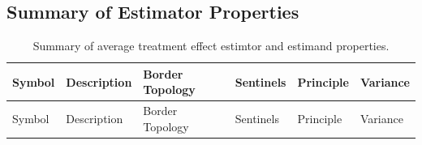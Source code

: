 \documentclass[letter]{article}
\begin{document}
    	\subsection{Summary of Estimator Properties}\label{summary-of-estimator-properties}

\begin{longtable}[]{@{}llllll@{}}
\caption{Summary of average treatment effect estimtor and estimand properties. \label{table:estimator_properties}}\tabularnewline
\toprule
\begin{minipage}[b]{0.09\columnwidth}\raggedright\strut
Symbol\strut
\end{minipage} & \begin{minipage}[b]{0.25\columnwidth}\raggedright\strut
Description\strut
\end{minipage} & \begin{minipage}[b]{0.13\columnwidth}\raggedright\strut
Border Topology\strut
\end{minipage} & \begin{minipage}[b]{0.13\columnwidth}\raggedright\strut
Sentinels\strut
\end{minipage} & \begin{minipage}[b]{0.15\columnwidth}\raggedright\strut
Principle\strut
\end{minipage} & \begin{minipage}[b]{0.08\columnwidth}\raggedright\strut
Variance\strut
\end{minipage}\tabularnewline
\midrule
\endfirsthead
\toprule
\begin{minipage}[b]{0.09\columnwidth}\raggedright\strut
Symbol\strut
\end{minipage} & \begin{minipage}[b]{0.25\columnwidth}\raggedright\strut
Description\strut
\end{minipage} & \begin{minipage}[b]{0.13\columnwidth}\raggedright\strut
Border Topology\strut
\end{minipage} & \begin{minipage}[b]{0.13\columnwidth}\raggedright\strut
Sentinels\strut
\end{minipage} & \begin{minipage}[b]{0.15\columnwidth}\raggedright\strut
Principle\strut
\end{minipage} & \begin{minipage}[b]{0.08\columnwidth}\raggedright\strut
Variance\strut
\end{minipage}\tabularnewline
\midrule

\end{longtable}
\end{document}
